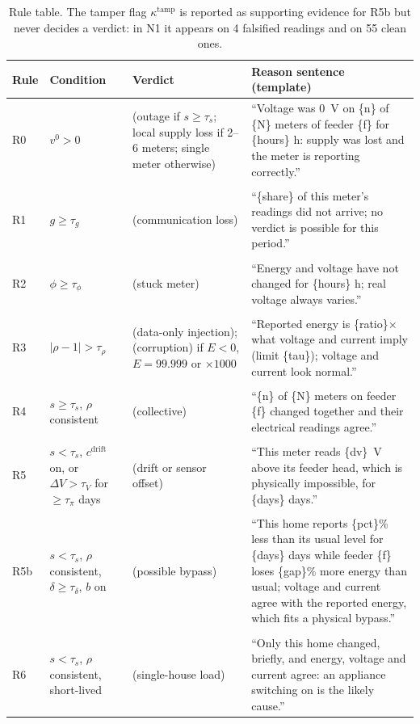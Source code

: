 \documentclass[11pt,a4paper]{article}
\begin{document}
\begin{table}[H]
\centering
\small
\begin{tabularx}{\textwidth}{@{}>{\raggedright\arraybackslash}p{0.9cm}>{\raggedright\arraybackslash}p{3.7cm}>{\raggedright\arraybackslash}p{3.1cm}L@{}}
\toprule
\textbf{Rule} & \textbf{Condition} & \textbf{Verdict} & \textbf{Reason sentence (template)} \\
\midrule
R0 & $v^{0}>0$ & \GE{} (outage if $s\ge\tau_s$; local supply loss if 2--6 meters; single meter otherwise) & ``Voltage was 0~V on \{n\} of \{N\} meters of feeder \{f\} for \{hours\} h: supply was lost and the meter is reporting correctly.'' \\ \\
R1 & $g\ge\tau_g$ & \ND{} (communication loss) & ``\{share\} of this meter's readings did not arrive; no verdict is possible for this period.'' \\ \\
R2 & $\phi\ge\tau_\phi$ & \MF{} (stuck meter) & ``Energy and voltage have not changed for \{hours\} h; real voltage always varies.'' \\ \\
R3 & $|\rho-1|>\tau_\rho$ & \SD{} (data-only injection); \MF{} (corruption) if $E<0$, $E=99.999$ or $\times1000$ & ``Reported energy is \{ratio\}$\times$ what voltage and current imply (limit \{tau\}); voltage and current look normal.'' \\ \\
R4 & $s\ge\tau_s$, $\rho$ consistent & \GE{} (collective) & ``\{n\} of \{N\} meters on feeder \{f\} changed together and their electrical readings agree.'' \\ \\
R5 & $s<\tau_s$, $c^{\mathrm{drift}}$ on, or $\Delta V>\tau_V$ for $\ge\tau_\pi$ days & \MF{} (drift or sensor offset) & ``This meter reads \{dv\}~V above its feeder head, which is physically impossible, for \{days\} days.'' \\ \\
R5b & $s<\tau_s$, $\rho$ consistent, $\delta\ge\tau_\delta$, $b$ on & \SD{} (possible bypass) & ``This home reports \{pct\}\% less than its usual level for \{days\} days while feeder \{f\} loses \{gap\}\% more energy than usual; voltage and current agree with the reported energy, which fits a physical bypass.'' \\ \\
R6 & $s<\tau_s$, $\rho$ consistent, short-lived & \GE{} (single-house load) & ``Only this home changed, briefly, and energy, voltage and current agree: an appliance switching on is the likely cause.'' \\
\bottomrule
\end{tabularx}
\caption{Rule table. The tamper flag $\kappa^{\mathrm{tamp}}$ is reported as supporting evidence for R5b but
never decides a verdict: in N1 it appears on 4 falsified readings and on 55 clean ones.}
\label{tab:rules}
\end{table}
\end{document}

